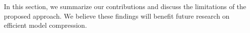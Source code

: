 In this section, we summarize our contributions and discuss the limitations of the proposed approach. We believe these findings will benefit future research on efficient model compression.
